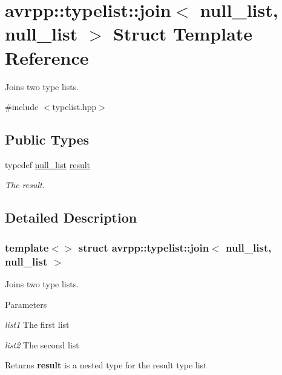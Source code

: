 \hypertarget{structavrpp_1_1typelist_1_1join_3_01null__list_00_01null__list_01_4}{
\section{avrpp::typelist::join$<$ null\_\-list, null\_\-list $>$ Struct Template Reference}
\label{structavrpp_1_1typelist_1_1join_3_01null__list_00_01null__list_01_4}
}


Joins two type lists.  




{\ttfamily \#include $<$typelist.hpp$>$}

\subsection*{Public Types}
\begin{DoxyCompactItemize}
\item 
typedef \hyperlink{structavrpp_1_1typelist_1_1null__list}{null\_\-list} \hyperlink{structavrpp_1_1typelist_1_1join_3_01null__list_00_01null__list_01_4_abb8cfd7d51be8059fe286f80dc69b047}{result}
\begin{DoxyCompactList}\small\item\em The result. \item\end{DoxyCompactList}\end{DoxyCompactItemize}


\subsection{Detailed Description}
\subsubsection*{template$<$$>$ struct avrpp::typelist::join$<$ null\_\-list, null\_\-list $>$}

Joins two type lists. 
\begin{DoxyParams}{Parameters}
\item[{\em list1}]The first list \item[{\em list2}]The second list \end{DoxyParams}
\begin{DoxyReturn}{Returns}
{\bfseries result} is a nested type for the result type list 
\end{DoxyReturn}


